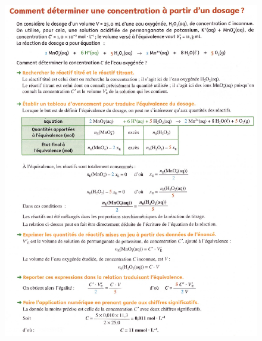 \documentclass[11pt,a4paper]{article}
\begin{document}
\begin{figure}[h]
    \centering
    \includegraphics[width=.85\linewidth]{imgs/c1/xo1.jpg}
\end{figure}  
\end{document}
